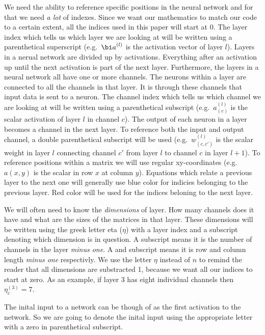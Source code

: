 We need the ability to reference specific positions in the neural network and for that we need {\em a lot} of indexes.
Since we want our mathematics to match our code to a certain extent, all the indices used in this paper will start at $0$.
The layer index which tells us which layer we are looking at will be written using a parenthetical superscript (e.g.\ ${\bi a}^{(l)}$ is the activation vector of layer $l$).
Layers in a nerual network are divided up by activations.
Everything after an activation up until the next activation is part of the next layer.
Furthermore, the layers in a neural network all have one or more channels.
The neurons within a layer are connected to all the channels in that layer.
It is through these channels that input data is sent to a neuron. 
The channel index which tells us which channel we are looking at will be written using a parenthetical subscript (e.g.\ $a^{(l)}_{(c)}$ is the scalar activation of layer $l$ in channel $c$).
The output of each neuron in a layer becomes a channel in the next layer.
To reference both the input and output channel, a double parenthetical subscript will be used (e.g.\ $w^{(l)}_{(c,c')}$ is the scalar weight in layer $l$ connecting channel $c'$ from layer $l$ to channel $c$ in layer $l+1$).
To reference positions within a matrix we will use regular xy-coordinates (e.g.\ $a(x,y)$ is the scalar in row $x$ at column $y$).
Equations which relate a previous layer to the next one will generally use blue color for indicies belonging to the previous layer.
Red color will be used for the indices beloning to the next layer.

We will often need to know the {\em dimensions} of layer.
How many channels does it have and what are the sizes of the matrices in that layer.
These dimensions will be written using the greek letter eta ($\eta$) with a layer index and a subscript denoting which dimension is in question.
A  subscript means it is the number of channels in the layer {\em minus one}.
A  and  subscript means it is row and column length {\em minus one} respectivly.
We use the letter $\eta$ instead of $n$ to remind the reader that all dimensions are substracted 1, because we want all our indices to start at zero.
As an example, if layer $3$ has eight individual channels then $\eta^{(3)}_c = 7$.

The inital input to a network can be though of as the first activation to the network.
So we are going to denote the inital input using the appropriate  letter with a zero in parenthetical subscript.
\stopsubsubject

